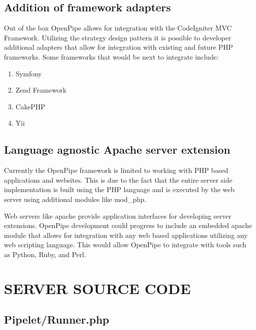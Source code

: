 \documentclass[12pt]{report}
\renewcommand{\cftchappresnum}{CHAPTER }
\newcommand{\rootPath}{../../}
\newcommand{\rootServerPath}{\rootPath server/}
\newcommand{\rootServerPhpPath}{\rootServerPath php/}
\newcommand{\phplist}[1]{}
\begin{document}
\section{Addition of framework adapters}
Out of the box OpenPipe allows for integration with the CodeIgniter MVC Framework. Utilizing the strategy design pattern it is possible to developer additional adapters that allow for integration with existing and future PHP frameworks. Some frameworks that would be next to integrate include:

\begin{enumerate}
	\item Symfony
	\item Zend Framework
	\item CakePHP
	\item Yii
\end{enumerate}

\section{Language agnostic Apache server extension}
Currently the OpenPipe framework is limited to working with PHP based applications and websites. This is due to the fact that the entire server side implementation is built  using the PHP language and is executed by the web server using additional modules like mod\_php. 

Web servers like apache provide application interfaces for developing server extensions. OpenPipe development could progress to include an embedded apache module that allows for integration with any web based applications utilizing any web scripting language. This would allow OpenPipe to integrate with tools such as Python, Ruby, and Perl.




\appendix
\singlespacing
\addtocontents{toc}{\def\protect\cftchappresnum{APPENDIX }}

\chapter{SERVER SOURCE CODE}
\section{Pipelet/Runner.php}
\phplist{OpenPipe/Runner.php}
\end{document}
